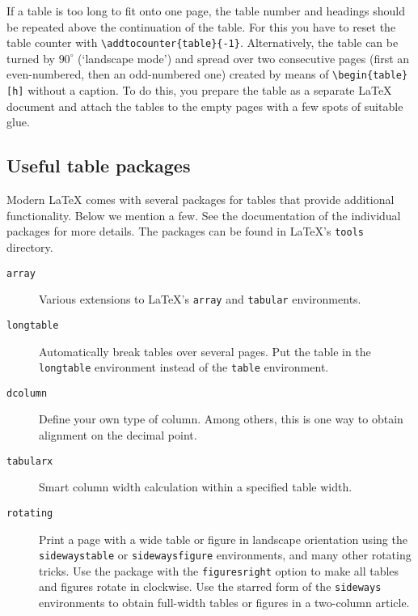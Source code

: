 \documentclass[fleqn,12pt,twoside]{article}
\begin{document}
If a table is too long to fit onto one page, the table number and
headings should be repeated above the continuation of the table. For
this you have to reset the table counter with
\verb|\addtocounter{table}{-1}|.  Alternatively, the table can be
turned by $90^\circ$ (`landscape mode') and spread over two
consecutive pages (first an even-numbered, then an odd-numbered one)
created by means of \verb|\begin{table}[h]| without a caption. To do
this, you prepare the table as a separate \LaTeX{} document and attach
the tables to the empty pages with a few spots of suitable glue.

\subsection{Useful table packages}

Modern \LaTeX{} comes with several packages for tables that
provide additional functionality. Below we mention a few. See
the documentation of the individual packages for more details. The
packages can be found in \LaTeX's \texttt{tools} directory.

\begin{description}
  
\item[\texttt{array}] Various extensions to \LaTeX's \texttt{array}
  and \texttt{tabular} environments.
  
\item[\texttt{longtable}] Automatically break tables over several
  pages. Put the table in the \texttt{longtable} environment instead
  of the \texttt{table} environment.
  
\item [\texttt{dcolumn}] Define your own type of column. Among others,
  this is one way to obtain alignment on the decimal point.

\item[\texttt{tabularx}] Smart column width calculation within a
  specified table width.
  
\item[\texttt{rotating}] Print a page with a wide table or figure in
  landscape orientation using the \texttt{sidewaystable} or
  \texttt{sidewaysfigure} environments, and many other rotating
  tricks. Use the package with the \texttt{figuresright} option to
  make all tables and figures rotate in clockwise. Use the starred
  form of the \texttt{sideways} environments to obtain full-width
  tables or figures in a two-column article.

\end{description}
\end{document}

